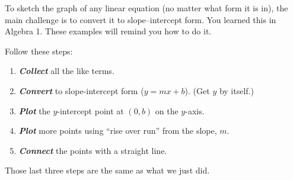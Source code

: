 \documentclass[fleqn,letterpaper,12pt,printwatermark=false]{memoir}
\begin{document}




To sketch the graph of any linear equation
(no matter what form it is in),
the main challenge is to convert it to slope--intercept form.
You learned this in Algebra 1.
These examples will remind you how to do it.

\begin{myKeyConcepts}
    Follow these steps:
    \begin{enumerate}
        \item {\bfseries\itshape Collect} all the like terms.
        \item {\bfseries\itshape Convert} to slope-intercept form ($y = mx + b$). (Get $y$ by itself.)
        \item {\bfseries\itshape Plot} the $y$-intercept point at $(0,b)$ on the $y$-axis. 
        \item {\bfseries\itshape Plot} more points using ``rise over run'' from the slope, $m$.
        \item {\bfseries\itshape Connect} the points with a straight line.
    \end{enumerate}
\end{myKeyConcepts}

Those last three steps are the same as what we just did.



\end{document}
